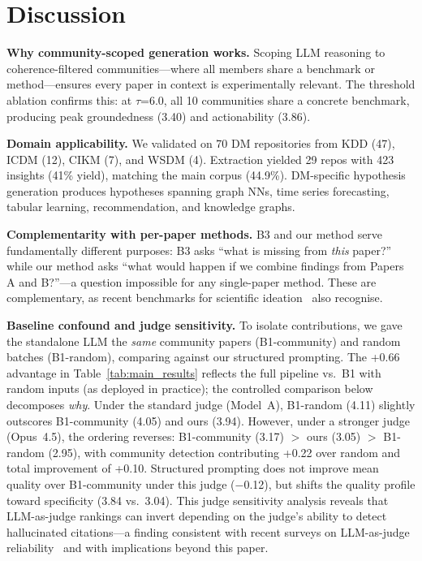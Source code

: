 \documentclass[conference]{IEEEtran}
\begin{document}
\section{Discussion}

\textbf{Why community-scoped generation works.}
Scoping LLM reasoning to coherence-filtered communities---where all members share a benchmark or method---ensures every paper in context is experimentally relevant.
The threshold ablation confirms this: at $\tau$=6.0, all 10 communities share a concrete benchmark, producing peak groundedness (3.40) and actionability (3.86).

\textbf{Domain applicability.}
We validated on 70 DM repositories from KDD (47), ICDM (12), CIKM (7), and WSDM (4).
Extraction yielded 29 repos with 423 insights (41\% yield), matching the main corpus (44.9\%).
DM-specific hypothesis generation produces hypotheses spanning graph NNs, time series forecasting, tabular learning, recommendation, and knowledge graphs.

\textbf{Complementarity with per-paper methods.}
B3 and our method serve fundamentally different purposes: B3 asks ``what is missing from \emph{this} paper?'' while our method asks ``what would happen if we combine findings from Papers A and B?''---a question impossible for any single-paper method.
These are complementary, as recent benchmarks for scientific ideation~\cite{researchbench2025} also recognise.

\textbf{Baseline confound and judge sensitivity.}
To isolate contributions, we gave the standalone LLM the \emph{same} community papers (B1-community) and random batches (B1-random), comparing against our structured prompting.
The +0.66 advantage in Table~\ref{tab:main_results} reflects the full pipeline vs.\ B1 with random inputs (as deployed in practice); the controlled comparison below decomposes \emph{why}.
Under the standard judge (Model~A), B1-random (4.11) slightly outscores B1-community (4.05) and ours (3.94).
However, under a stronger judge (Opus~4.5), the ordering reverses: B1-community (3.17) $>$ ours (3.05) $>$ B1-random (2.95), with community detection contributing +0.22 over random and total improvement of +0.10.
Structured prompting does not improve mean quality over B1-community under this judge ($-$0.12), but shifts the quality profile toward specificity (3.84 vs.\ 3.04).
This judge sensitivity analysis reveals that LLM-as-judge rankings can invert depending on the judge's ability to detect hallucinated citations---a finding consistent with recent surveys on LLM-as-judge reliability~\cite{gu2025llmjudge} and with implications beyond this paper.
\end{document}
